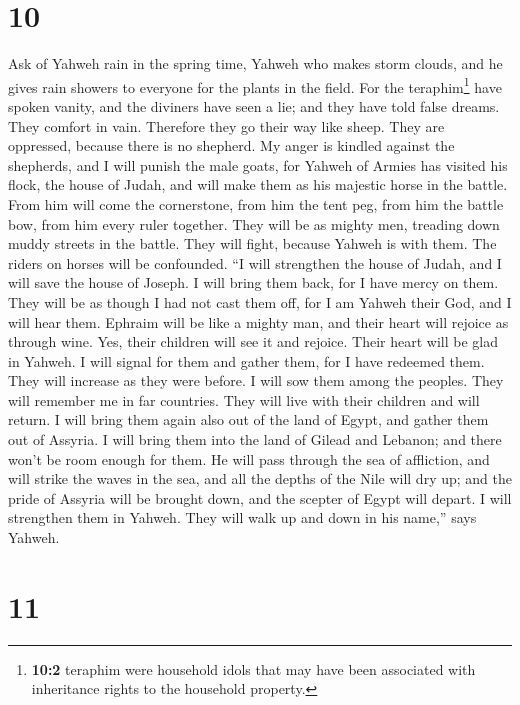 \hypertarget{section-9}{%
\section{10}\label{section-9}}

 Ask of Yahweh rain in the spring time, Yahweh who makes
storm clouds, and he gives rain showers to everyone for the plants in
the field.  For the teraphim\footnote{\textbf{10:2}
  teraphim were household idols that may have been associated with
  inheritance rights to the household property.} have spoken vanity, and
the diviners have seen a lie; and they have told false dreams. They
comfort in vain. Therefore they go their way like sheep. They are
oppressed, because there is no shepherd.  My anger is
kindled against the shepherds, and I will punish the male goats, for
Yahweh of Armies has visited his flock, the house of Judah, and will
make them as his majestic horse in the battle.  From him
will come the cornerstone, from him the tent peg, from him the battle
bow, from him every ruler together.  They will be as
mighty men, treading down muddy streets in the battle. They will fight,
because Yahweh is with them. The riders on horses will be confounded.
 ``I will strengthen the house of Judah, and I will save
the house of Joseph. I will bring them back, for I have mercy on them.
They will be as though I had not cast them off, for I am Yahweh their
God, and I will hear them.  Ephraim will be like a mighty
man, and their heart will rejoice as through wine. Yes, their children
will see it and rejoice. Their heart will be glad in Yahweh.
 I will signal for them and gather them, for I have
redeemed them. They will increase as they were before.  I
will sow them among the peoples. They will remember me in far countries.
They will live with their children and will return.  I
will bring them again also out of the land of Egypt, and gather them out
of Assyria. I will bring them into the land of Gilead and Lebanon; and
there won't be room enough for them.  He will pass
through the sea of affliction, and will strike the waves in the sea, and
all the depths of the Nile will dry up; and the pride of Assyria will be
brought down, and the scepter of Egypt will depart.  I
will strengthen them in Yahweh. They will walk up and down in his
name,'' says Yahweh.

\hypertarget{section-10}{%
\section{11}\label{section-10}}

